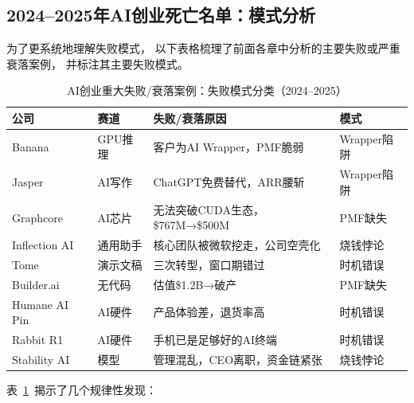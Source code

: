 \subsection{2024--2025年AI创业死亡名单：模式分析}

为了更系统地理解失败模式，
以下表格梳理了前面各章中分析的主要失败或严重衰落案例，
并标注其主要失败模式。

\begin{table}[htbp]
\centering
\caption{AI创业重大失败/衰落案例：失败模式分类（2024--2025）}
\label{tab:failure-cases}
\small
\begin{tabularx}{\textwidth}{l l X l}
\toprule
\rowcolor{figLightGray}
\textbf{公司} & \textbf{赛道} & \textbf{失败/衰落原因} & \textbf{模式} \\
\midrule
Banana         & GPU推理   & 客户为AI Wrapper，PMF脆弱      & Wrapper陷阱 \\
\addlinespace
Jasper         & AI写作   & ChatGPT免费替代，ARR腰斩       & Wrapper陷阱 \\
\addlinespace
Graphcore      & AI芯片   & 无法突破CUDA生态，\$767M→\$500M & PMF缺失 \\
\addlinespace
Inflection AI  & 通用助手 & 核心团队被微软挖走，公司空壳化   & 烧钱悖论 \\
\addlinespace
Tome           & 演示文稿 & 三次转型，窗口期错过             & 时机错误 \\
\addlinespace
Builder.ai     & 无代码   & 估值\$1.2B→破产                 & PMF缺失 \\
\addlinespace
Humane AI Pin  & AI硬件   & 产品体验差，退货率高             & 时机错误 \\
\addlinespace
Rabbit R1      & AI硬件   & 手机已是足够好的AI终端           & 时机错误 \\
\addlinespace
Stability AI   & 模型     & 管理混乱，CEO离职，资金链紧张    & 烧钱悖论 \\
\bottomrule
\end{tabularx}
\end{table}

表~\ref{tab:failure-cases}~揭示了几个规律性发现：

